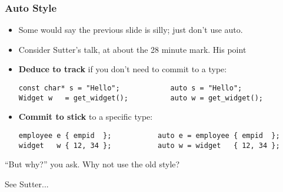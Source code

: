 \begin{frame}[fragile]
\frametitle{Auto Style}

\begin{itemize}[<+->]
\item Some would say the previous slide is silly; just don't use auto.
\item Consider Sutter's talk, at about the 28 minute mark.  His point
\item {\bf Deduce to track} if you don't need to commit to a type:
{\scriptsize \begin{verbatim}
const char* s = "Hello";            auto s = "Hello";
Widget w   = get_widget();          auto w = get_widget();   
\end{verbatim} }
\item {\bf Commit to stick} to a specific type:
{\scriptsize \begin{verbatim}
employee e { empid  };           auto e = employee { empid  };
widget   w { 12, 34 };           auto w = widget   { 12, 34 };
\end{verbatim} }
\end{itemize} %

\vskip 6pt
``But why?'' you ask.  Why not use the old style?

\vskip 6pt
See Sutter...

\end{frame}

